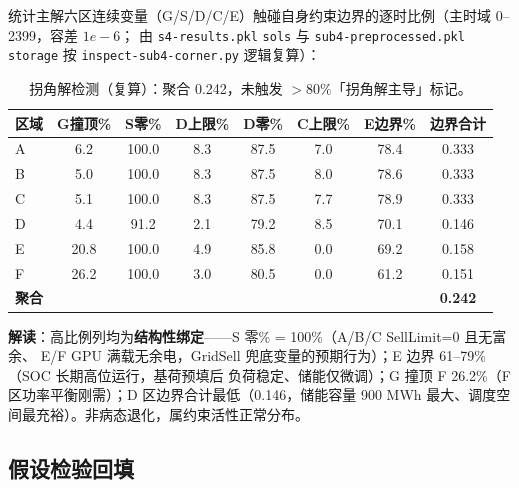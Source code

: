 \documentclass{internal-report}
\begin{document}
统计主解六区连续变量（G/S/D/C/E）触碰自身约束边界的逐时比例（主时域 0--2399，容差 $1e{-}6$；
由 \texttt{s4-results.pkl} \texttt{sols} 与 \texttt{sub4-preprocessed.pkl} \texttt{storage} 按
\texttt{inspect-sub4-corner.py} 逻辑复算）：

\begin{table}[H]
\centering
\footnotesize
\begin{tabular}{lccccccc}
\toprule
区域 & G撞顶\% & S零\% & D上限\% & D零\% & C上限\% & E边界\% & 边界合计 \\
\midrule
A & 6.2 & 100.0 & 8.3 & 87.5 & 7.0 & 78.4 & 0.333 \\
B & 5.0 & 100.0 & 8.3 & 87.5 & 8.0 & 78.6 & 0.333 \\
C & 5.1 & 100.0 & 8.3 & 87.5 & 7.7 & 78.9 & 0.333 \\
D & 4.4 & 91.2 & 2.1 & 79.2 & 8.5 & 70.1 & 0.146 \\
E & 20.8 & 100.0 & 4.9 & 85.8 & 0.0 & 69.2 & 0.158 \\
F & 26.2 & 100.0 & 3.0 & 80.5 & 0.0 & 61.2 & 0.151 \\
\midrule
\textbf{聚合} & & & & & & & \textbf{0.242} \\
\bottomrule
\end{tabular}
\caption{拐角解检测（复算）：聚合 0.242，未触发 $>80\%$「拐角解主导」标记。}
\label{tab:corner}
\end{table}

\textbf{解读}：高比例列均为\textbf{结构性绑定}——S 零\% = 100\%（A/B/C SellLimit=0 且无富余、
E/F GPU 满载无余电，GridSell 兜底变量的预期行为）；E 边界 61--79\%（SOC 长期高位运行，基荷预填后
负荷稳定、储能仅微调）；G 撞顶 F 26.2\%（F 区功率平衡刚需）；D 区边界合计最低（0.146，储能容量
900 MWh 最大、调度空间最充裕）。非病态退化，属约束活性正常分布。

\subsection{假设检验回填}
\label{sec:hypothesis}
\end{document}
